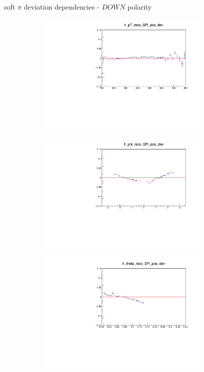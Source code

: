 \documentclass[11pt]{beamer}
\begin{document}
\begin{frame}{soft $\pi$ deviation dependencies - $DOWN$ polarity}
\begin{figure}
\begin{subfigure}{0.45\textwidth}
\includegraphics[width=0.9\textwidth]{third/down_pdf/deviation/h_pt_reco_SPi_pos_dev.pdf}
\end{subfigure}
\begin{subfigure}{0.45\textwidth}
\includegraphics[width=0.9\textwidth]{third/down_pdf/deviation/h_phi_reco_SPi_pos_dev.pdf}
\end{subfigure}
\begin{subfigure}{0.45\textwidth}
\includegraphics[width=0.9\textwidth]{third/down_pdf/deviation/h_theta_reco_SPi_pos_dev.pdf}

\end{subfigure}
\end{figure}
\end{frame}
\end{document}
